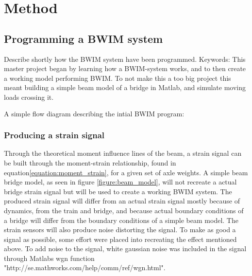 \section{Method}

\subsection{Programming a BWIM system}
Describe shortly how the BWIM system have been programmed.
Keywords:
This master project began by learning how a BWIM-system works, and to then create a working model performing BWIM. To not make this a too big project this meant building a simple beam model of a bridge in Matlab, and simulate moving loads crossing it.

A simple flow diagram describing the intial BWIM program:
\begin{figure}[H]
	\centering
	
\end{figure}


\subsubsection{Producing a strain signal}
Through the theoretical moment influence lines of the beam, a strain signal can be built through the moment-strain relationship, found in equation\ref{equation:moment_strain}, for a given set of axle weights. A simple beam bridge model, as seen in figure \ref{figure:beam_model}, will not recreate a actual bridge strain signal but will be used to create a working BWIM system. The produced strain signal will differ from an actual strain signal mostly because of dynamics, from the train and bridge, and because actual boundary conditions of a bridge will differ from the boundary conditions of a simple beam model. The strain sensors will also produce noise distorting the signal.
To make as good a signal as possible, some effort were placed into recreating the effect mentioned above. To add noise to the signal, white gaussian noise was included in the signal through Matlabs wgn function "http://se.mathworks.com/help/comm/ref/wgn.html".



